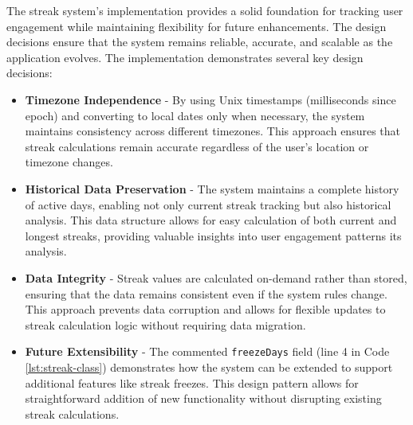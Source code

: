 The streak system's implementation provides a solid foundation for tracking user engagement while maintaining flexibility for future enhancements. The design decisions ensure that the system remains reliable, accurate, and scalable as the application evolves. The implementation demonstrates several key design decisions:

\begin{itemize}
    \item \textbf{Timezone Independence} - By using Unix timestamps (milliseconds since epoch) and converting to local dates only when necessary, the system maintains consistency across different timezones. This approach ensures that streak calculations remain accurate regardless of the user's location or timezone changes.
    
    \item \textbf{Historical Data Preservation} - The system maintains a complete history of active days, enabling not only current streak tracking but also historical analysis. This data structure allows for easy calculation of both current and longest streaks, providing valuable insights into user engagement patterns its analysis.
    
    \item \textbf{Data Integrity} - Streak values are calculated on-demand rather than stored, ensuring that the data remains consistent even if the system rules change. This approach prevents data corruption and allows for flexible updates to streak calculation logic without requiring data migration.
    
    \item \textbf{Future Extensibility} - The commented \texttt{freezeDays} field (line 4 in Code \ref{lst:streak-class}) demonstrates how the system can be extended to support additional features like streak freezes. This design pattern allows for straightforward addition of new functionality without disrupting existing streak calculations.
\end{itemize}